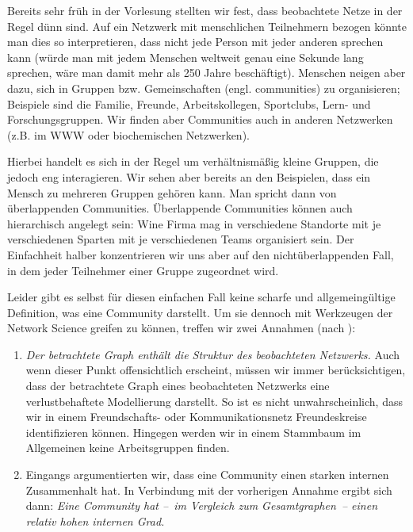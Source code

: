 Bereits sehr früh in der Vorlesung stellten wir fest, dass beobachtete Netze in der Regel dünn sind.
Auf ein Netzwerk mit menschlichen Teilnehmern bezogen könnte man dies so interpretieren, dass nicht jede Person mit jeder anderen sprechen kann (würde man mit jedem Menschen weltweit genau eine Sekunde lang sprechen, wäre man damit mehr als 250 Jahre beschäftigt).
Menschen neigen aber dazu, sich in Gruppen bzw. Gemeinschaften (engl. communities) zu organisieren;
Beispiele sind die Familie, Freunde, Arbeitskollegen, Sportclubs, Lern- und Forschungsgruppen.
Wir finden aber Communities auch in anderen Netzwerken (z.B. im WWW oder biochemischen Netzwerken).

Hierbei handelt es sich in der Regel um verhältnismäßig kleine Gruppen, die jedoch eng interagieren.
Wir sehen aber bereits an den Beispielen, dass ein Mensch zu mehreren Gruppen gehören kann.
Man spricht dann von überlappenden Communities.
Überlappende Communities können auch hierarchisch angelegt sein: Wine Firma mag in verschiedene Standorte mit je verschiedenen Sparten mit je verschiedenen Teams organisiert sein.
Der Einfachheit halber konzentrieren wir uns aber auf den nichtüberlappenden Fall, in dem jeder Teilnehmer einer Gruppe zugeordnet wird.

Leider gibt es selbst für diesen einfachen Fall keine scharfe und allgemeingültige Definition, was eine Community darstellt.
Um sie dennoch mit Werkzeugen der Network Science greifen zu können, treffen wir zwei Annahmen (nach \cite{barabasi2014network}):

\begin{enumerate}[label=H\arabic*), ref=H\arabic*]
    \item\label{enum:contains_structure}
          \emph{Der betrachtete Graph enthält die Struktur des beobachteten Netzwerks.}
          Auch wenn dieser Punkt offensichtlich erscheint, müssen wir immer berücksichtigen, dass der betrachtete Graph eines beobachteten Netzwerks eine verlustbehaftete Modellierung darstellt.
          So ist es nicht unwahrscheinlich, dass wir in einem Freundschafts- oder Kommunikationsnetz Freundeskreise identifizieren können.
          Hingegen werden wir in einem Stammbaum im Allgemeinen keine Arbeitsgruppen finden.

    \item\label{enum:high_internal_degree}
          Eingangs argumentierten wir, dass eine Community einen starken internen Zusammenhalt hat.
          In Verbindung mit der vorherigen Annahme ergibt sich dann:
          \emph{Eine Community hat --~im Vergleich zum Gesamtgraphen~-- einen relativ hohen internen Grad.}
\end{enumerate}

